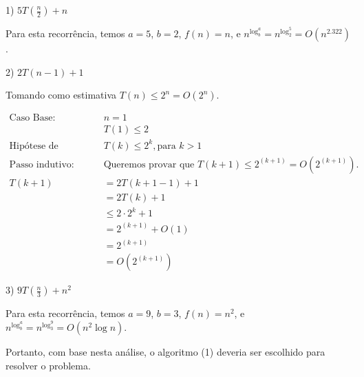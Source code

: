 \documentclass[]{article}
\begin{document}
1) $5T(\frac{n}{2}) + n$

Para esta recorrência, temos $a=5$, $b=2$, $f(n)=n$, e $n^{\log_b^a} = n^{\log_2^5} = O(n^{2.322})$.

\vspace{0.5cm}

2) $2T(n-1) + 1$

Tomando como estimativa $T(n) \leq 2^n = O(2^n)$.

\begin{align*}
    \text{Caso Base}: \quad & n = 1 \\
                      \quad & T(1) \leq 2 \\
    \text{Hipótese de indução:} \quad & T(k) \leq 2^k, \text{para } k>1 \\
    \text{Passo indutivo:} \quad & \text{Queremos provar que } T(k+1) \leq 2^{(k+1)} = O(2^{(k+1)}). \\
                            T(k+1) & = 2T(k+1-1)+1 \\
                                   & = 2T(k)+1 \\
                                   & \leq 2 \cdot 2^k + 1 \\
                                   & = 2^{(k+1)} + O(1) \\
                                   & = 2^{(k+1)} \\
                                   & = O(2^{(k+1)})
\end{align*}

\vspace{0.5cm}

3) $9T(\frac{n}{3}) + n^2$

Para esta recorrência, temos $a=9$, $b=3$, $f(n)=n^2$, e $n^{\log_b^a} = n^{\log_3^9} = O(n^2 \log n)$.

\vspace{0.5cm}

Portanto, com base nesta análise, o algoritmo (1) deveria ser escolhido para resolver o problema.
\end{document}
